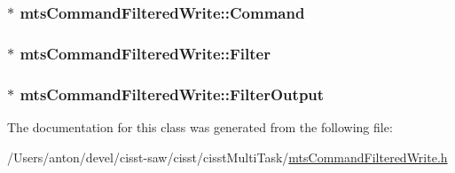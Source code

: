 \subsubsection[{Command}]{$\ast$ mts\+Command\+Filtered\+Write\+::\+Command\hspace{0.3cm}{\ttfamily [protected]}}\label{classmts_command_filtered_write_a58cf3073e6fbdf0874d8aa369d3500cd}
\hypertarget{classmts_command_filtered_write_afbf763a5226ddc747f8dd25219b2e027}{}
\subsubsection[{Filter}]{$\ast$ mts\+Command\+Filtered\+Write\+::\+Filter\hspace{0.3cm}{\ttfamily [protected]}}\label{classmts_command_filtered_write_afbf763a5226ddc747f8dd25219b2e027}
\hypertarget{classmts_command_filtered_write_a87da9e319a6eb2fe6f4ca23efbf59bce}{}
\subsubsection[{Filter\+Output}]{$\ast$ mts\+Command\+Filtered\+Write\+::\+Filter\+Output\hspace{0.3cm}{\ttfamily [protected]}}\label{classmts_command_filtered_write_a87da9e319a6eb2fe6f4ca23efbf59bce}


The documentation for this class was generated from the following file\+:\begin{DoxyCompactItemize}
\item 
/\+Users/anton/devel/cisst-\/saw/cisst/cisst\+Multi\+Task/\hyperlink{mts_command_filtered_write_8h}{mts\+Command\+Filtered\+Write.\+h}\end{DoxyCompactItemize}

